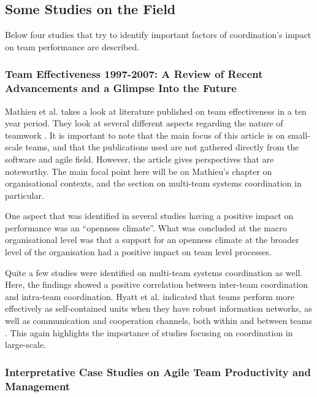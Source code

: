 \subsection{Some Studies on the Field}
\label{large_scale_coordination}

Below four studies that try to identify important factors of coordination's impact on team performance are described.

\subsubsection{Team Effectiveness 1997-2007: A Review of Recent Advancements and a Glimpse Into the Future}

Mathieu et al. takes a look at literature published on team effectiveness in a ten year period. They look at several different aspects regarding the nature of teamwork \cite{Mathieu2008}. It is important to note that the main focus of this article is on small-scale teams, and that the publications used are not gathered directly from the software and agile field. However, the article gives perspectives that are noteworthy. The main focal point here will be on Mathieu's chapter on organisational contexts, and the section on multi-team systems coordination in particular.

One aspect that was identified in several studies having a positive impact on performance was an ``openness climate''. What was concluded at the macro organisational level was that a support for an openness climate at the broader level of the organisation had a positive impact on team level processes.

Quite a few studies were identified on multi-team systems coordination as well. Here, the findings showed a positive correlation between inter-team coordination and intra-team coordination. Hyatt et al. indicated that teams perform more effectively as self-contained units when they have robust information networks, as well as communication and cooperation channels, both within and between teams \cite{Hyatt1997}. This again highlights the importance of studies focusing on coordination in large-scale.

\subsubsection{Interpretative Case Studies on Agile Team Productivity and Management}

